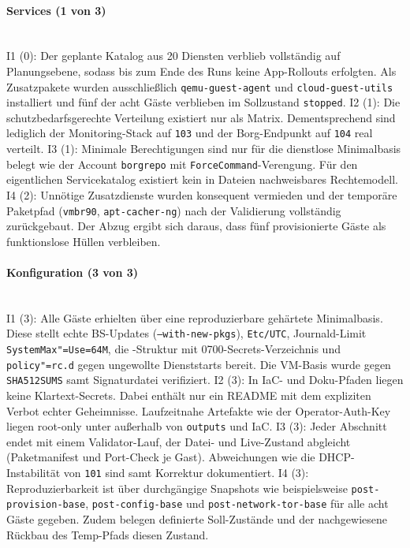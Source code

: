 \paragraph{Services (1 von 3)} \mbox{}\\
I1 (0): Der geplante Katalog aus 20 Diensten verblieb vollständig auf Planungsebene, sodass bis zum Ende des Runs keine App-Rollouts erfolgten. Als Zusatzpakete wurden ausschließlich \texttt{qemu-guest-agent} und \texttt{cloud-guest-utils} installiert und fünf der acht Gäste verblieben im Sollzustand \texttt{stopped}.\cite{finalsummaryB,masterplanB}
I2 (1): Die schutzbedarfsgerechte Verteilung existiert nur als Matrix. Dementsprechend sind lediglich der Monitoring-Stack auf \texttt{103} und der
Borg-Endpunkt auf \texttt{104} real verteilt.\cite{masterplanB,finalsummaryB}
I3 (1): Minimale Berechtigungen sind nur für die dienstlose Minimalbasis belegt wie der Account \texttt{borgrepo} mit \texttt{ForceCommand}-Verengung.
Für den eigentlichen Servicekatalog existiert kein in Dateien nachweisbares Rechtemodell.\cite{section5scriptB,finalsummaryB}
I4 (2): Unnötige Zusatzdienste wurden konsequent vermieden und der temporäre Paketpfad (\texttt{vmbr90}, \texttt{apt-cacher-ng}) nach der Validierung vollständig zurückgebaut. 
Der Abzug ergibt sich daraus, dass fünf provisionierte Gäste als funktionslose Hüllen verbleiben.\cite{finalsummaryB,implementationlogB}

\paragraph{Konfiguration (3 von 3)} \mbox{}\\
I1 (3): Alle Gäste erhielten über  eine reproduzierbare gehärtete Minimalbasis. Diese stellt echte \ac{BS}-Updates (\texttt{--with-new-pkgs}), \texttt{Etc/UTC}, Journald-Limit \texttt{SystemMax"=Use=64M}, die -Struktur mit 0700-Secrets-Verzeichnis und \texttt{policy"=rc.d} gegen ungewollte Dienststarts bereit. 
Die \ac{VM}-Basis wurde gegen \texttt{SHA512SUMS} samt Signaturdatei verifiziert.\cite{section3scriptB,validatornotesB,masterplanB}
I2 (3): In \ac{IaC}- und Doku-Pfaden liegen keine Klartext-Secrets. Dabei enthält  nur ein README mit dem expliziten Verbot echter Geheimnisse. 
Laufzeitnahe Artefakte wie der Operator-Auth-Key liegen root-only unter  außerhalb von \texttt{outputs} und \ac{IaC}.\cite{section3scriptB,implementationlogB}
I3 (3): Jeder Abschnitt endet mit einem Validator-Lauf, der Datei- und Live-Zustand abgleicht (Paketmanifest und Port-Check je Gast). Abweichungen wie die \ac{DHCP}-Instabilität von \texttt{101} sind samt Korrektur dokumentiert.\cite{validatornotesB,implementationlogB}
I4 (3): Reproduzierbarkeit ist über durchgängige Snapshots wie beispielsweise \texttt{post-provision-base}, \texttt{post-config-base} und \texttt{post-network-tor-base} für alle acht Gäste gegeben. Zudem belegen definierte Soll-Zustände und der nachgewiesene Rückbau des Temp-Pfads
diesen Zustand.\cite{finalsummaryB,validatornotesB}

